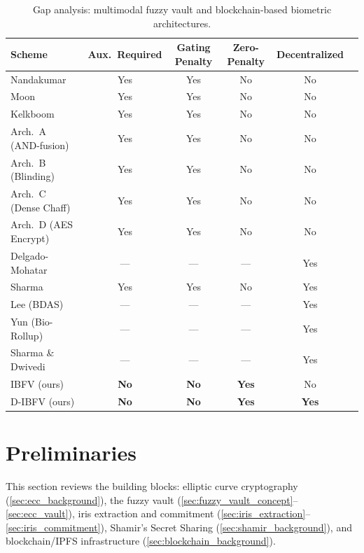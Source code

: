 \documentclass[3p,twocolumn]{elsarticle}
\newcommand{\IBFV}{\textsf{IBFV}}
\newcommand{\DIBFV}{\textsf{D-IBFV}}
\begin{document}
\begin{table}[t]
\centering
\caption{Gap analysis: multimodal fuzzy vault and blockchain-based biometric architectures.}
\label{tab:related_gap}
\begin{tabular}{@{}l c c c c c@{}}
\toprule
\textbf{Scheme} & \textbf{Aux.\ Required} & \textbf{Gating Penalty} & \textbf{Zero-Penalty} & \textbf{Decentralized}\\
\midrule
Nandakumar~\cite{nandakumar2008multibiometric} & Yes & Yes & No & No\\
Moon~\cite{moon2010multibiometric} & Yes & Yes & No & No\\
Kelkboom~\cite{kelkboom2011multialgorithm} & Yes & Yes & No & No\\
Arch.\ A (AND-fusion) & Yes & Yes & No & No\\
Arch.\ B (Blinding) & Yes & Yes & No & No\\
Arch.\ C (Dense Chaff) & Yes & Yes & No & No\\
Arch.\ D (AES Encrypt) & Yes & Yes & No & No\\
\midrule
Delgado-Mohatar~\cite{delgado2020blockchain} & --- & --- & --- & Yes\\
Sharma~\cite{sharma2024multimodal} & Yes & Yes & No & Yes\\
Lee (BDAS)~\cite{lee2021securing} & --- & --- & --- & Yes\\
Yun (Bio-Rollup)~\cite{yun2024biorollup} & --- & --- & --- & Yes\\
Sharma \& Dwivedi~\cite{sharma2026fabric} & --- & --- & --- & Yes\\
\midrule
\IBFV{} (ours) & \textbf{No} & \textbf{No} & \textbf{Yes} & No\\
\DIBFV{} (ours) & \textbf{No} & \textbf{No} & \textbf{Yes} & \textbf{Yes}\\
\bottomrule
\end{tabular}
\end{table}

\section{Preliminaries}
\label{sec:preliminaries}

This section reviews the building blocks: elliptic curve cryptography (\ref{sec:ecc_background}), the fuzzy vault (\ref{sec:fuzzy_vault_concept}--\ref{sec:ecc_vault}), iris extraction and commitment (\ref{sec:iris_extraction}--\ref{sec:iris_commitment}), Shamir's Secret Sharing (\ref{sec:shamir_background}), and blockchain/IPFS infrastructure (\ref{sec:blockchain_background}).
\end{document}
